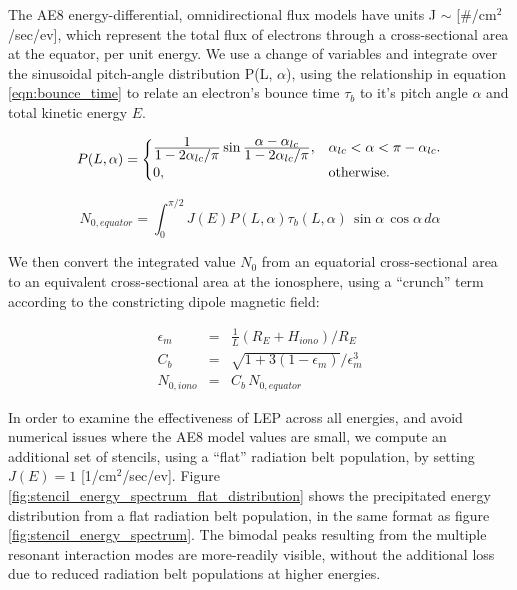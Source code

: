 The AE8 energy-differential, omnidirectional flux models have units J $\sim$ [$\#$/cm$^2$/sec/ev], which represent the total flux of electrons through a cross-sectional area at the equator, per unit energy. We use a change of variables and integrate over the sinusoidal pitch-angle distribution P(L, $\alpha$), using the relationship in equation \eqref{eqn:bounce_time} to relate an electron's bounce time $\tau_b$ to it's pitch angle $\alpha$ and total kinetic energy $E$.

\begin{equation}
  P(L,\alpha)=\begin{cases}
    \frac{\displaystyle 1}{\displaystyle 1 - 2\alpha_{lc}/\pi}\sin{\ensuremath{\frac{\displaystyle \alpha - \alpha_{lc}}{\displaystyle 1 - 2\alpha_{lc}/\pi}}}, & \text{$\alpha_{lc} < \alpha < \pi - \alpha_{lc}$}.\\
    0, & \text{otherwise}.
  \end{cases}
\end{equation}


\begin{equation}
N_{0,equator} = \int_0^{\pi/2} J(E)P(L,\alpha) \tau_b(L, \alpha)\,\sin{\alpha}\,\cos{\alpha}\,d\alpha 
\end{equation}

We then convert the integrated value $N_0$ from an equatorial cross-sectional area to an equivalent cross-sectional area at the ionosphere, using a ``crunch'' term according to the constricting dipole magnetic field:

\begin{eqnarray}
\epsilon_m &= & \frac{1}{L}(R_E + H_{iono})/R_E \\
C_b & = & \sqrt{1 + 3(1 - \epsilon_m)} / \epsilon_m^3 \\
N_{0, iono} &=& C_b\,N_{0, equator}
\label{eqn:fieldline_density}
\end{eqnarray}

In order to examine the effectiveness of LEP across all energies, and avoid numerical issues where the AE8 model values are small, we compute an additional set of stencils, using a ``flat'' radiation belt population, by setting $J(E) = 1$ [1/cm$^2$/sec/ev].  Figure \ref{fig:stencil_energy_spectrum_flat_distribution} shows the precipitated energy distribution from a flat radiation belt population, in the same format as figure \ref{fig:stencil_energy_spectrum}. The bimodal peaks resulting from the multiple resonant interaction modes are more-readily visible, without the additional loss due to reduced radiation belt populations at higher energies.

